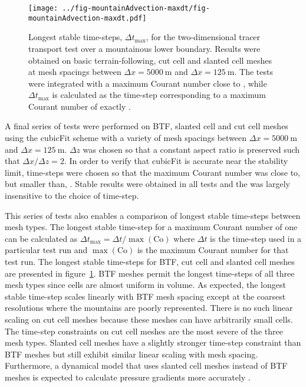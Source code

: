 \begin{figure}
	\centering
	\texttt{[image: ../fig-mountainAdvection-maxdt/fig-mountainAdvection-maxdt.pdf]}
	\caption{Longest stable time-steps, $\Delta t_\mathrm{max}$, for the two-dimensional tracer transport test over a mountainous lower boundary.  Results were obtained on basic terrain-following, cut cell and slanted cell meshes at mesh spacings between $\Delta x = \SI{5000}{\meter}$ and $\Delta x = \SI{125}{\meter}$.  The tests were integrated with a maximum Courant number close to , while $\Delta t_\mathrm{max}$ is calculated as the time-step corresponding to a maximum Courant number of exactly .}
	\label{fig:mountainAdvection-maxdt}
\end{figure}

A final series of tests were performed on BTF, slanted cell and cut cell meshes using the cubicFit scheme with a variety of mesh spacings between $\Delta x = \SI{5000}{\meter}$ and $\Delta x = \SI{125}{\meter}$.  $\Delta z$ was chosen so that a constant aspect ratio is preserved such that $\Delta x / \Delta z = 2$.  In order to verify that cubicFit is accurate near the stability limit, time-steps were chosen so that the maximum Courant number was close to, but smaller than, .  Stable results were obtained in all tests and the  was largely insensitive to the choice of time-step.

This series of tests also enables a comparison of longest stable time-steps between mesh types.
The longest stable time-step for a maximum Courant number of one can be calculated as $\Delta t_\mathrm{max} = \Delta t / \max(\mathrm{Co})$ where $\Delta t$ is the time-step used in a particular test run and $\max(\mathrm{Co})$ is the maximum Courant number for that test run.
The longest stable time-steps for BTF, cut cell and slanted cell meshes are presented in figure~\ref{fig:mountainAdvection-maxdt}.  BTF meshes permit the longest time-steps of all three mesh types since cells are almost uniform in volume.  As expected, the longest stable time-step scales linearly with BTF mesh spacing except at the coarsest resolutions where the mountains are poorly represented.
There is no such linear scaling on cut cell meshes because these meshes can have arbitrarily small cells.  The time-step constraints on cut cell meshes are the most severe of the three mesh types.  Slanted cell meshes have a slightly stronger time-step constraint than BTF meshes but still exhibit similar linear scaling with mesh spacing.  Furthermore, a dynamical model that uses slanted cell meshes instead of BTF meshes is expected to calculate pressure gradients more accurately \citep{shaw-weller2016}.

